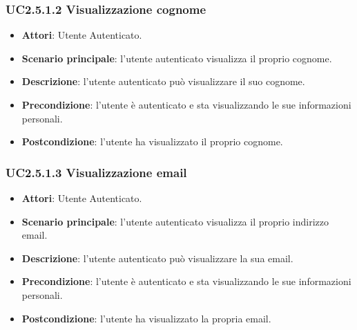\subsubsection{UC2.5.1.2 Visualizzazione cognome}
\begin{itemize}
\item \textbf{Attori}: Utente Autenticato.
\item \textbf{Scenario principale}: l'utente autenticato visualizza il proprio cognome.
\item \textbf{Descrizione}: l'utente autenticato può visualizzare il suo cognome.
\item \textbf{Precondizione}: l'utente è autenticato e sta visualizzando le sue informazioni personali.
\item \textbf{Postcondizione}: l'utente ha visualizzato il proprio cognome.
\end{itemize}
\subsubsection{UC2.5.1.3 Visualizzazione email}
\begin{itemize}
\item \textbf{Attori}: Utente Autenticato.
\item \textbf{Scenario principale}: l'utente autenticato visualizza il proprio indirizzo email.
\item \textbf{Descrizione}: l'utente autenticato può visualizzare la sua email.
\item \textbf{Precondizione}: l'utente è autenticato e sta visualizzando le sue informazioni personali.
\item \textbf{Postcondizione}: l'utente ha visualizzato la propria email.
\end{itemize}
